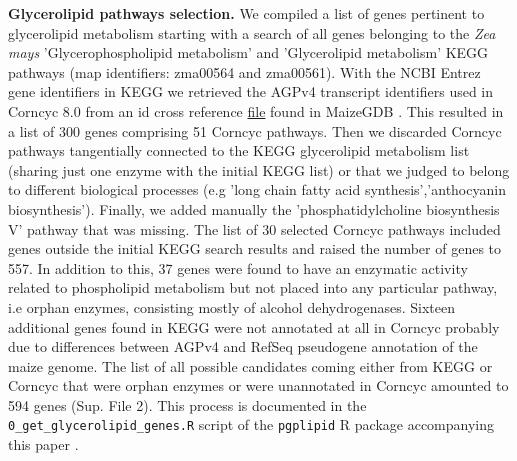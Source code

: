 \documentclass[9pt,twocolumn,twoside,lineno]{BioRxiv}
\begin{document}
\textbf{Glycerolipid pathways selection.}
We compiled a list of genes pertinent to glycerolipid metabolism starting with a search of all genes belonging to the \textit{Zea mays} 'Glycerophospholipid metabolism' and 'Glycerolipid metabolism' KEGG pathways \cite{kanehisa2019} (map identifiers: zma00564 and zma00561). 
With the NCBI Entrez gene identifiers in KEGG we retrieved the AGPv4 transcript identifiers used in Corncyc 8.0 \cite{portwood2019, walsh2016} from an id cross reference \href{https://www.maizegdb.org/search/gene/download_gene_xrefs.php?relative=v4}{file} found in MaizeGDB   \cite{portwood2019}.
This resulted in a list of 300 genes comprising 51 Corncyc pathways. 
Then we discarded Corncyc pathways  tangentially connected to the KEGG glycerolipid metabolism list (sharing just one enzyme with the initial KEGG list) or that we judged to belong to different biological processes (e.g 'long chain fatty acid synthesis','anthocyanin biosynthesis'). 
Finally, we added manually the 'phosphatidylcholine biosynthesis V' pathway that was missing. 
The list of 30 selected Corncyc pathways included genes outside the initial KEGG search results and raised the number of genes to 557. 
In addition to this, 37 genes were found to have an enzymatic activity related to phospholipid metabolism but not placed into any particular pathway, i.e orphan enzymes, consisting mostly of alcohol dehydrogenases. 
Sixteen additional genes found in KEGG were not annotated at all in Corncyc probably due to differences between AGPv4 and RefSeq pseudogene annotation of the maize genome. 
The list of all possible candidates coming either from KEGG or Corncyc that were orphan enzymes or were unannotated in Corncyc amounted to 594 genes (Sup. File 2). 
This process is documented in the \verb|0_get_glycerolipid_genes.R| script of the \verb|pgplipid| R package accompanying this paper \cite{fausto_rodriguez_zapata_2020_4323410}.
\end{document}
